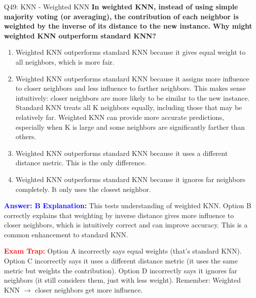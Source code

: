 \documentclass[8pt]{beamer}
\begin{document}
	\begin{frame}{Q49: KNN - Weighted KNN}
		\fontsize{6.5}{7.5}\selectfont
		\textbf{In weighted KNN, instead of using simple majority voting (or averaging), the contribution of each neighbor is weighted by the inverse of its distance to the new instance. Why might weighted KNN outperform standard KNN?}
		
		\begin{enumerate}
			\item Weighted KNN outperforms standard KNN because it gives equal weight to all neighbors, which is more fair.
			\item Weighted KNN outperforms standard KNN because it assigns more influence to closer neighbors and less influence to farther neighbors. This makes sense intuitively: closer neighbors are more likely to be similar to the new instance. Standard KNN treats all K neighbors equally, including those that may be relatively far. Weighted KNN can provide more accurate predictions, especially when K is large and some neighbors are significantly farther than others.
			\item Weighted KNN outperforms standard KNN because it uses a different distance metric. This is the only difference.
			\item Weighted KNN outperforms standard KNN because it ignores far neighbors completely. It only uses the closest neighbor.
		\end{enumerate}
		
		\vspace{0.1cm}
		\textcolor{blue}{\textbf{Answer: B}}
		\vspace{0.1cm}
		\textcolor{blue}{\textbf{Explanation:}} This tests understanding of weighted KNN. Option B correctly explains that weighting by inverse distance gives more influence to closer neighbors, which is intuitively correct and can improve accuracy. This is a common enhancement to standard KNN.
		
		\textcolor{red}{\textbf{Exam Trap:}} Option A incorrectly says equal weights (that's standard KNN). Option C incorrectly says it uses a different distance metric (it uses the same metric but weights the contribution). Option D incorrectly says it ignores far neighbors (it still considers them, just with less weight). Remember: Weighted KNN $\rightarrow$ closer neighbors get more influence.
	\end{frame}
	
\end{document}
